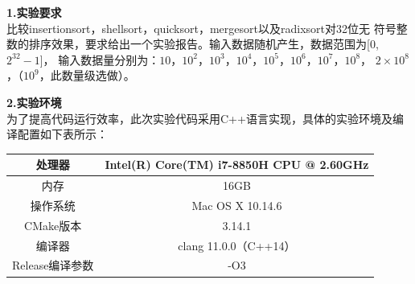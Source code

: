 \documentclass[a4paper]{article}
\begin{document}
\courseheader
{}

\info

\begin{enumerate}
  \setlength{\itemsep}{3\parskip}
  \textbf{1.实验要求}\\
  比较insertionsort，shellsort，quicksort，mergesort以及radixsort对32位无
  符号整数的排序效果，要求给出一个实验报告。输入数据随机产生，数据范围为[0,$2^{32}-1$]，
  输入数据量分别为：$10$，$10^2$，$10^3$，$10^4$，$10^5$，$10^6$，$10^7$，$10^8$，
  $2\times10^8$，（$10^9$，此数量级选做）。\\
  \bigskip

  \textbf{2.实验环境}\\
  为了提高代码运行效率，此次实验代码采用C++语言实现，具体的实验环境及编译配置如下表所示：\\ \medskip
  \begin{tabular}{c|c}
    \hline\hline
    处理器 & Intel(R) Core(TM) i7-8850H CPU @ 2.60GHz \\ \hline
    内存 & 16GB\\ \hline
    操作系统& Mac OS X 10.14.6\\ \hline
    CMake版本& 3.14.1\\ \hline
    编译器& clang 11.0.0（C++14）\\ \hline
    Release编译参数& -O3\\
    \hline\hline
  \end{tabular}\\
  \bigskip


\end{enumerate}
\end{document}
